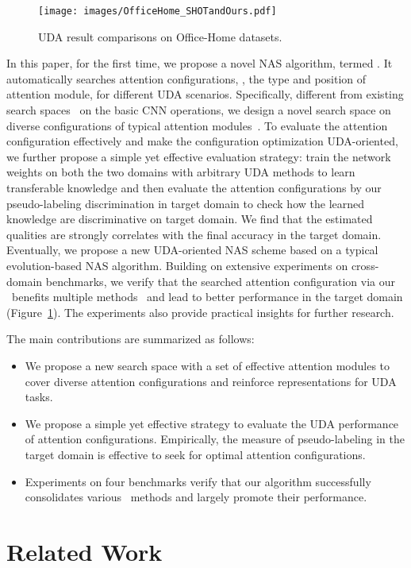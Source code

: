 \documentclass[10pt,twocolumn,letterpaper]{article}
\begin{document}
\begin{figure}
    \centering
    \texttt{[image: images/OfficeHome\_SHOTandOurs.pdf]}
    \caption{UDA result comparisons on Office-Home datasets.
}
    \label{fig:SHOT_vs_SHOTandOurs}
    \vspace{-4mm}
\end{figure} 
In this paper, for the first time, we propose a novel NAS algorithm, termed \iMethod.
It automatically searches attention configurations, \ie, the type and position of attention module, for different UDA scenarios.
Specifically, different from existing search spaces~\cite{zoph2018NASNet,liu2018DARTS} on the basic CNN operations, we design a novel search space on diverse configurations of typical attention modules~\cite{woo2018cbam,hu2018SENet,gao2019GSoP}. 
To evaluate the attention configuration effectively and make the configuration optimization UDA-oriented, we further propose a simple yet effective evaluation strategy: train the network weights on both the two domains with arbitrary UDA methods to learn transferable knowledge and then evaluate the attention configurations by our pseudo-labeling discrimination in target domain to check how the learned knowledge are discriminative on target domain. We find that the estimated qualities are strongly correlates with the final accuracy in the target domain.
Eventually, we propose a new UDA-oriented NAS scheme based on a typical evolution-based NAS algorithm.
Building on extensive experiments on  cross-domain benchmarks, we verify that the searched attention configuration via our \iMethod\ benefits multiple \SOTA methods~\cite{liang2020shot,ge2020MMT,wang2020PAN} and lead to better performance in the target domain (Figure~\ref{fig:SHOT_vs_SHOTandOurs}). The experiments also provide practical insights for further research.

The main contributions are summarized as follows:
\begin{itemize}[leftmargin=*]
    \setlength{\itemsep}{0pt}
    \setlength{\parsep}{0pt}
    \item We propose a new search space with a set of effective attention modules to cover diverse attention configurations and reinforce representations for UDA tasks.
    
    \item We propose a simple yet effective strategy to evaluate the UDA performance of attention configurations. Empirically, the measure of pseudo-labeling in the target domain is effective to seek for optimal attention configurations.
    
    \item Experiments on four benchmarks verify that our algorithm successfully consolidates various \SOTA\ methods and largely promote their performance.
\end{itemize} \section{Related Work}
\end{document}

